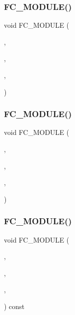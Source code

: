 \subsubsection{\texorpdfstring{F\+C\+\_\+\+M\+O\+D\+U\+L\+E()}{FC\_MODULE()}\hspace{0.1cm}{\footnotesize\ttfamily [24/26]}}
{\footnotesize\ttfamily void F\+C\+\_\+\+M\+O\+D\+U\+LE (\begin{DoxyParamCaption}\item[{operators}]{,  }\item[{zawpxy}]{,  }\item[{O\+P\+E\+R\+A\+T\+O\+RS}]{,  }\item[{Z\+A\+W\+P\+XY}]{ }\end{DoxyParamCaption})}

\hypertarget{SimpleKernels_8H_a0c8508a474c666c3dc565736b6549623}{}\label{SimpleKernels_8H_a0c8508a474c666c3dc565736b6549623} 
\subsubsection{\texorpdfstring{F\+C\+\_\+\+M\+O\+D\+U\+L\+E()}{FC\_MODULE()}\hspace{0.1cm}{\footnotesize\ttfamily [25/26]}}
{\footnotesize\ttfamily void F\+C\+\_\+\+M\+O\+D\+U\+LE (\begin{DoxyParamCaption}\item[{operators}]{,  }\item[{zvwpxy}]{,  }\item[{O\+P\+E\+R\+A\+T\+O\+RS}]{,  }\item[{Z\+V\+W\+P\+XY}]{ }\end{DoxyParamCaption})}

\hypertarget{SimpleKernels_8H_adc4801661a9b1ab74d8a42cbe59fb78a}{}\label{SimpleKernels_8H_adc4801661a9b1ab74d8a42cbe59fb78a} 
\subsubsection{\texorpdfstring{F\+C\+\_\+\+M\+O\+D\+U\+L\+E()}{FC\_MODULE()}\hspace{0.1cm}{\footnotesize\ttfamily [26/26]}}
{\footnotesize\ttfamily void F\+C\+\_\+\+M\+O\+D\+U\+LE (\begin{DoxyParamCaption}\item[{operators}]{,  }\item[{zxym1}]{,  }\item[{O\+P\+E\+R\+A\+T\+O\+RS}]{,  }\item[{Z\+X\+Y\+M1}]{ }\end{DoxyParamCaption}) const}

